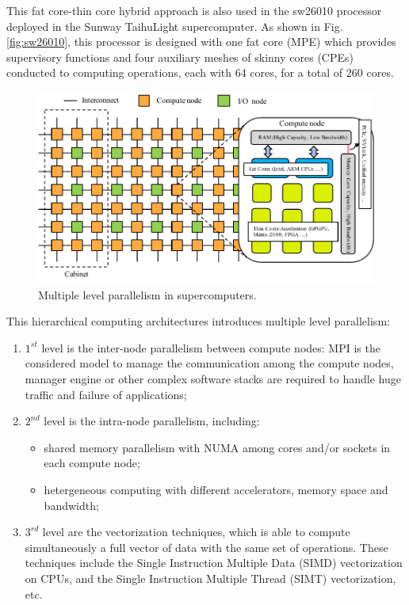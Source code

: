 This fat core-thin core hybrid approach is also used in the sw26010 processor deployed in the Sunway TaihuLight supercomputer. As shown in Fig. \ref{fig:sw26010}, this processor is designed with one fat core (MPE) which provides supervisory functions and four auxiliary meshes of skinny cores  (CPEs) conducted to computing operations, each with 64 cores, for a total of 260 cores.

\begin{figure}[htbp]
	\centering
	\includegraphics[width=6.2in]{fig/supercomputer_arch.pdf}
	\caption{Multiple level parallelism in supercomputers.}
	\label{fig:supercomputer_arch}
\end{figure}

This hierarchical computing architectures introduces multiple level parallelism:

\begin{enumerate}
	\item $1^{st}$ level is the inter-node parallelism between compute nodes: MPI is the considered model to manage the communication among the compute nodes, manager engine or other complex software stacks are required to handle huge traffic and failure of applications;
	\item $2^{nd}$ level is the intra-node parallelism, including:
	\begin{itemize}
		\item shared memory parallelism with NUMA among cores and/or sockets in each compute node;
		\item hetergeneous computing with different accelerators, memory space and bandwidth;
	\end{itemize}
	\item $3^{rd}$ level are the vectorization techniques, which is able to compute simultaneously a full vector of data with the same set of operations. These techniques include the Single Instruction Multiple Data (SIMD) vectorization on CPUs, and the Single Instruction Multiple Thread (SIMT) vectorization, etc.
\end{enumerate}

